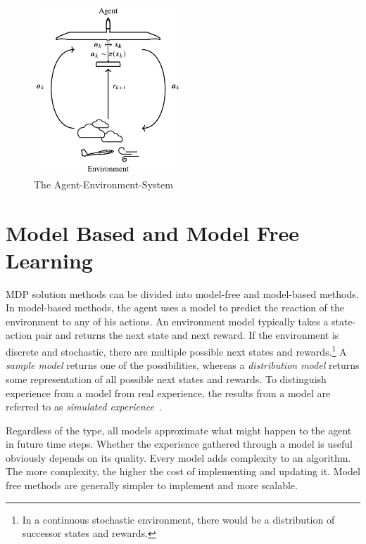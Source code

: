 \begin{figure}[h]
	\centering
	\includegraphics[width=0.5\textwidth]{src/pics/RLProblem.pdf}
	\caption{The Agent-Environment-System~\cite{Notter2018}}
	\label{fig:agent_env_system} 
\end{figure}

\section{Model Based and Model Free Learning}
\label{sec:modelbasedmodelfree}

MDP solution methods can be divided into model-free and model-based methods. In model-based methods, the agent uses a model to predict the reaction of the environment to any of his actions. An environment model typically takes a state-action pair and returns the next state and next reward. If the environment is discrete and stochastic, there are multiple possible next states and rewards.\footnote{In a continuous stochastic environment, there would be a distribution of successor states and rewards.} A \textit{sample model} returns one of the possibilities, whereas a \textit{distribution model} returns some representation of all possible next states and rewards. To distinguish experience from a model from real experience, the results from a model are referred to as \textit{simulated experience}~\cite[section~8.1]{SuttonBarto2018}.

Regardless of the type, all models approximate what might happen to the agent in future time steps. Whether the experience gathered through a model is useful obviously depends on its quality. Every model adds complexity to an algorithm. The more complexity, the higher the cost of implementing and updating it. Model free methods are generally simpler to implement and more scalable. 

